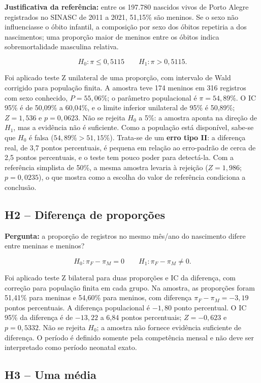 \documentclass[12pt]{article}
\begin{document}
\textbf{Justificativa da referência:} entre os 197.780 nascidos vivos de Porto Alegre registrados no SINASC de 2011 a 2021, 51,15\% são meninos. Se o sexo não influenciasse o óbito infantil, a composição por sexo dos óbitos repetiria a dos nascimentos; uma proporção maior de meninos entre os óbitos indica sobremortalidade masculina relativa.

\[
H_0: \pi \le 0{,}5115
\qquad
H_1: \pi > 0{,}5115.
\]

Foi aplicado teste Z unilateral de uma proporção, com intervalo de Wald corrigido para população finita. A amostra teve 174 meninos em 316 registros com sexo conhecido, \(P=55{,}06\%\); o parâmetro populacional é \(\pi=54{,}89\%\). O IC 95\% é de 50,09\% a 60,04\%, e o limite inferior unilateral de 95\% é 50,89\%; \(Z=1{,}536\) e \(p=0{,}0623\). Não se rejeita \(H_0\) a 5\%: a amostra aponta na direção de \(H_1\), mas a evidência não é suficiente. Como a população está disponível, sabe-se que \(H_0\) é falsa (\(54{,}89\% > 51{,}15\%\)). Trata-se de um \textbf{erro tipo II}: a diferença real, de 3,7 pontos percentuais, é pequena em relação ao erro-padrão de cerca de 2,5 pontos percentuais, e o teste tem pouco poder para detectá-la. Com a referência simplista de 50\%, a mesma amostra levaria à rejeição (\(Z=1{,}986\); \(p=0{,}0235\)), o que mostra como a escolha do valor de referência condiciona a conclusão.

\subsection{H2 -- Diferença de proporções}

\textbf{Pergunta:} a proporção de registros no mesmo mês/ano do nascimento difere entre meninas e meninos?

\[
H_0: \pi_F-\pi_M=0
\qquad
H_1: \pi_F-\pi_M\ne 0.
\]

Foi aplicado teste Z bilateral para duas proporções e IC da diferença, com correção para população finita em cada grupo. Na amostra, as proporções foram 51,41\% para meninas e 54,60\% para meninos, com diferença \(\pi_F-\pi_M=-3{,}19\) pontos percentuais. A diferença populacional é \(-1{,}80\) ponto percentual. O IC 95\% da diferença é de \(-13{,}22\) a 6,84 pontos percentuais; \(Z=-0{,}623\) e \(p=0{,}5332\). Não se rejeita \(H_0\); a amostra não fornece evidência suficiente de diferença. O período é definido somente pela competência mensal e não deve ser interpretado como período neonatal exato.

\subsection{H3 -- Uma média}
\end{document}
